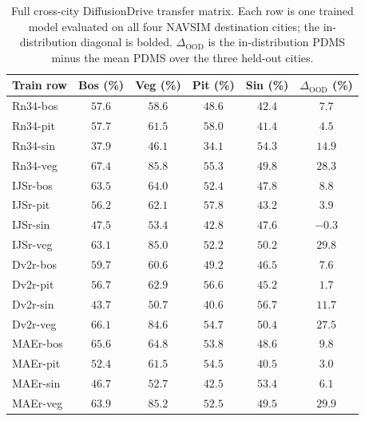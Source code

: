 \begin{table}[ht]
\centering
\caption[Full cross-city DiffusionDrive transfer matrix.]{Full cross-city DiffusionDrive transfer matrix. Each row is one trained model evaluated on all four NAVSIM destination cities; the in-distribution diagonal is bolded. $\Delta_\text{OOD}$ is the in-distribution PDMS minus the mean PDMS over the three held-out cities.}
\label{tab:dd-cc-full}
\small
\renewcommand{\arraystretch}{1.15}
\setlength{\tabcolsep}{5pt}
\begin{tabular}{@{}>{\raggedright\arraybackslash}p{3.0cm} c c c c c@{}}
\toprule
\textbf{Train row} & \textbf{Bos (\%)} & \textbf{Veg (\%)} & \textbf{Pit (\%)} & \textbf{Sin (\%)} & \textbf{$\Delta_\text{OOD}$ (\%)} \\
\midrule
Rn34-bos & $\mathbf{57.6}$ & $58.6$ & $48.6$ & $42.4$ & $7.7$ \\
Rn34-pit & $57.7$ & $61.5$ & $\mathbf{58.0}$ & $41.4$ & $4.5$ \\
Rn34-sin & $37.9$ & $46.1$ & $34.1$ & $\mathbf{54.3}$ & $14.9$ \\
Rn34-veg & $67.4$ & $\mathbf{85.8}$ & $55.3$ & $49.8$ & $28.3$ \\
\midrule
IJSr-bos & $\mathbf{63.5}$ & $64.0$ & $52.4$ & $47.8$ & $8.8$ \\
IJSr-pit & $56.2$ & $62.1$ & $\mathbf{57.8}$ & $43.2$ & $3.9$ \\
IJSr-sin & $47.5$ & $53.4$ & $42.8$ & $\mathbf{47.6}$ & $-0.3$ \\
IJSr-veg & $63.1$ & $\mathbf{85.0}$ & $52.2$ & $50.2$ & $29.8$ \\
\midrule
Dv2r-bos & $\mathbf{59.7}$ & $60.6$ & $49.2$ & $46.5$ & $7.6$ \\
Dv2r-pit & $56.7$ & $62.9$ & $\mathbf{56.6}$ & $45.2$ & $1.7$ \\
Dv2r-sin & $43.7$ & $50.7$ & $40.6$ & $\mathbf{56.7}$ & $11.7$ \\
Dv2r-veg & $66.1$ & $\mathbf{84.6}$ & $54.7$ & $50.4$ & $27.5$ \\
\midrule
MAEr-bos & $\mathbf{65.6}$ & $64.8$ & $53.8$ & $48.6$ & $9.8$ \\
MAEr-pit & $52.4$ & $61.5$ & $\mathbf{54.5}$ & $40.5$ & $3.0$ \\
MAEr-sin & $46.7$ & $52.7$ & $42.5$ & $\mathbf{53.4}$ & $6.1$ \\
MAEr-veg & $63.9$ & $\mathbf{85.2}$ & $52.5$ & $49.5$ & $29.9$ \\
\bottomrule
\end{tabular}
\end{table}

